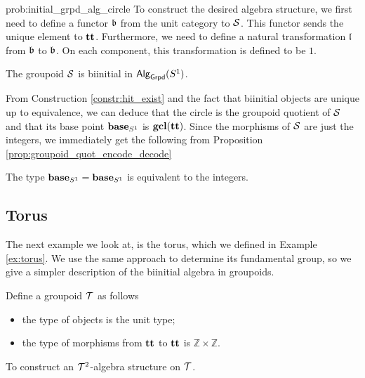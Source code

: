 \begin{construction}{prob:initial_grpd_alg_circle}
To construct the desired algebra structure, we first need to define a functor $\mathfrak{b}$ from the unit category to $\mathcal{S}$.
This functor sends the unique element to $\operatorname{\mathbf{tt}}$.
Furthermore, we need to define a natural transformation $\mathfrak{l}$ from $\mathfrak{b}$ to $\mathfrak{b}$.
On each component, this transformation is defined to be $1$.
\end{construction}

\begin{proposition}
The groupoid $\mathcal{S}$ is biinitial in $\mathsf{Alg}_{\mathsf{Grpd}}(S^1)$.
\end{proposition}

From Construction \ref{constr:hit_exist} and the fact that biinitial objects are unique up to equivalence,
we can deduce that the circle is the groupoid quotient of $\mathcal{S}$ and that its base point $\operatorname{\mathbf{base}}_{S^1}$ is $\operatorname{\mathbf{gcl}}(\operatorname{\mathbf{tt}})$.
Since the morphisms of $\mathcal{S}$ are just the integers, we immediately get the following from Proposition \ref{prop:groupoid_quot_encode_decode}

\begin{corollary}
The type $\operatorname{\mathbf{base}}_{S^1} = \operatorname{\mathbf{base}}_{S^1}$ is equivalent to the integers.
\end{corollary}

\subsection{Torus}
\label{sec:torus_fund_group}
The next example we look at, is the torus, which we defined in Example \ref{ex:torus}.
We use the same approach to determine its fundamental group, so we give a simpler description of the biinitial algebra in groupoids.

\begin{definition}
Define a groupoid $\mathcal{T}$ as follows
\begin{itemize}
	\item the type of objects is the unit type;
	\item the type of morphisms from $\operatorname{\mathbf{tt}}$ to $\operatorname{\mathbf{tt}}$ is $\mathbb{Z} \times \mathbb{Z}$.
\end{itemize}
\end{definition}

\begin{problem}
\label{prob:initial_grpd_alg_torus}
To construct an $\mathcal{T}^2$-algebra structure on $\mathcal{T}$.
\end{problem}

